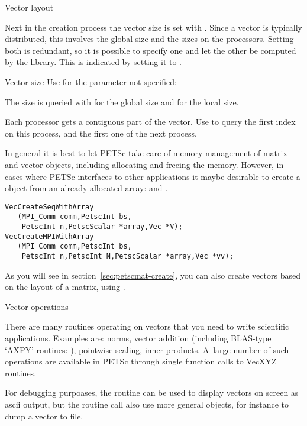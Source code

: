  {Vector layout}

Next in the creation process the vector size is set with .
Since a
vector is typically distributed, this involves the global size and the
sizes on the processors. Setting both is redundant, so it is possible
to specify one and let the other be computed by the library. This is
indicated by setting it to .

\begin{pythonnote}{Vector size}
  Use  for the parameter not specified:
\end{pythonnote}

The size is queried with  for the global size
and  for the local size.

Each processor gets a contiguous part of the vector. Use
 to query the first index on this
process, and the first one of the next process.

In general it is best to let PETSc take care of memory management of
matrix and vector objects, including allocating and freeing the memory.
However, in cases where PETSc interfaces to other applications it maybe desirable
to create a  object from an already
allocated array:  and
.
\begin{lstlisting}
VecCreateSeqWithArray
   (MPI_Comm comm,PetscInt bs,
    PetscInt n,PetscScalar *array,Vec *V);
VecCreateMPIWithArray
   (MPI_Comm comm,PetscInt bs,
    PetscInt n,PetscInt N,PetscScalar *array,Vec *vv);  
\end{lstlisting}

As you will see in section~\ref{sec:petscmat-create},
you can also create vectors based on the layout of a matrix,
using .

 {Vector operations}

There are many routines operating on vectors that you need
to write scientific applications. Examples are: norms, vector addition
(including \ac{BLAS}-type `AXPY' routines: ),
pointwise scaling, inner products.
A~large number of such operations are available in PETSc through
single function calls to {VecXYZ} routines.

For debugging purpoases,
the  routine can be used to display vectors on screen as
ascii output,
%
%
but the routine call also use more general  objects, for
instance to dump a vector to file.


